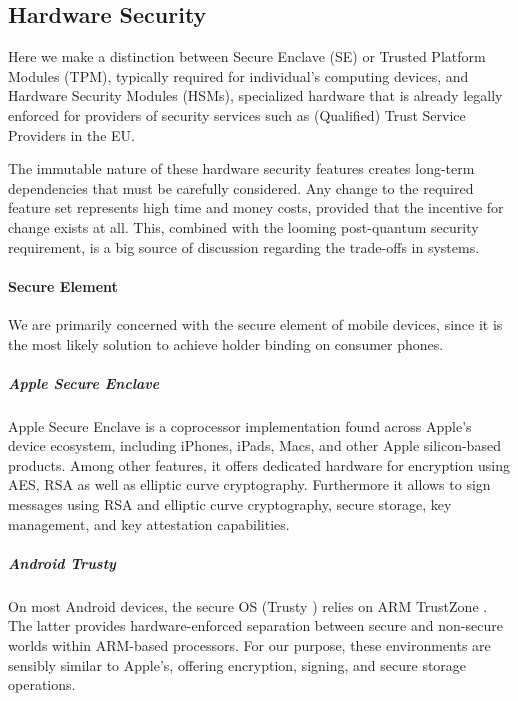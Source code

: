 
\subsection{Hardware Security}

Here we make a distinction between Secure Enclave (SE) or Trusted Platform Modules (TPM), typically required for individual's computing devices, and Hardware Security Modules (HSMs), specialized hardware that is already legally enforced for providers of security services such as (Qualified) Trust Service Providers in the EU.

The immutable nature of these hardware security features creates long-term dependencies that must be carefully considered. Any change to the required feature set represents high time and money costs, provided that the incentive for change exists at all. This, combined with the looming post-quantum security requirement, is a big source of discussion regarding the trade-offs in \eid systems.


\paragraph{Secure Element} We are primarily concerned with the secure element of mobile devices, since it is the most likely solution to achieve holder binding on consumer phones.

\subparagraph{Apple Secure Enclave}

Apple Secure Enclave \cite{apple-secure-enclaves} is a coprocessor implementation found across Apple's device ecosystem, including iPhones, iPads, Macs, and other Apple silicon-based products. Among other features, it offers dedicated hardware for encryption using AES, RSA as well as elliptic curve cryptography.
Furthermore it allows to sign messages using RSA and elliptic curve cryptography, secure storage, key management, and key attestation capabilities.

\subparagraph{Android Trusty}

On most Android devices, the secure OS (Trusty \cite{trusty}) relies on ARM TrustZone \cite{arm-trustzone}. The latter provides hardware-enforced separation between secure and non-secure worlds within ARM-based processors.
For our purpose, these environments are sensibly similar to Apple's, offering encryption, signing, and secure storage operations.


